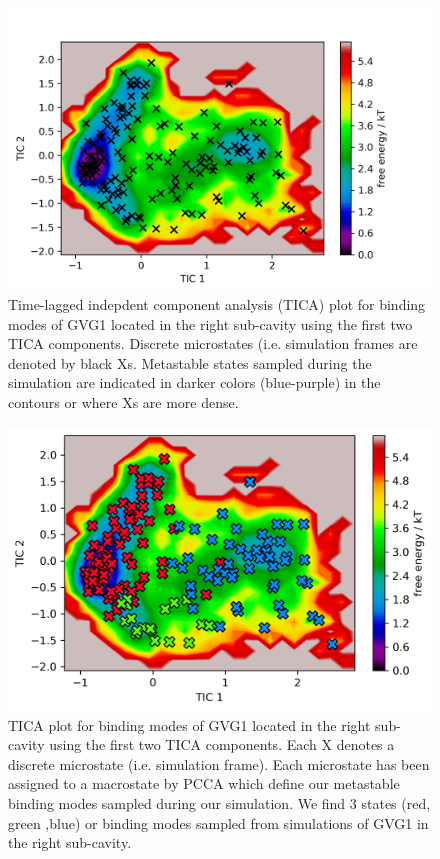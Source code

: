 \begin{figure}
    \centering
    \includegraphics[width=\linewidth]{chapter6/Figures/GVG_1-right_c4-tica.png}
    \caption[TICA plots for GVG1]{Time-lagged indepdent component analysis (TICA) plot for binding modes of GVG1 located in the right sub-cavity using the first two TICA components. Discrete microstates (i.e. simulation frames are denoted by black Xs. Metastable states sampled during the simulation are indicated in darker colors (blue-purple) in the contours or where Xs are more dense.}
    \label{fig:GVG_1-right-tica}
\end{figure}

\begin{figure}
    \centering
    \includegraphics[width=\linewidth]{chapter6/Figures/GVG_1-right-pcca.png}
    \caption[PCCA plot for GVG1]{TICA plot for binding modes of GVG1 located in the right sub-cavity using the first two TICA components. Each X denotes a discrete microstate (i.e. simulation frame). Each microstate has been assigned to a macrostate by PCCA which define our metastable binding modes sampled during our simulation. We find 3 states (red, green ,blue) or binding modes sampled from simulations of GVG1 in the right sub-cavity.}
    \label{fig:GVG_1-right-pcca}
\end{figure}

